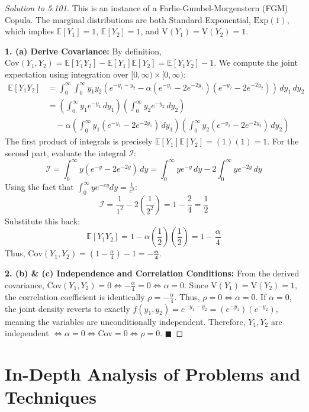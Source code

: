 \documentclass[11pt, a4paper]{article}
\theoremstyle{definition}
\theoremstyle{remark}
\newcommand{\E}{\mathbb{E}}
\newcommand{\Cov}{\mathrm{Cov}}
\newcommand{\Var}{\mathrm{V}}
\begin{document}
\begin{proof}[Solution to 5.101]
This is an instance of a Farlie-Gumbel-Morgenstern (FGM) Copula. The marginal distributions are both Standard Exponential, $\text{Exp}(1)$, which implies $\E[Y_1] = 1$, $\E[Y_2] = 1$, and $\Var(Y_1)=\Var(Y_2)=1$.

\textbf{1. (a) Derive Covariance:}
By definition, $\Cov(Y_1, Y_2) = \E[Y_1 Y_2] - \E[Y_1]\E[Y_2] = \E[Y_1 Y_2] - 1$. We compute the joint expectation using integration over $[0, \infty) \times [0, \infty)$:
\begin{align*}
\E[Y_1 Y_2] &= \int_0^\infty \int_0^\infty y_1 y_2 \left( e^{-y_1-y_2} - \alpha (e^{-y_1} - 2e^{-2y_1})(e^{-y_2} - 2e^{-2y_2}) \right) \,dy_1 \,dy_2 \\
&= \left(\int_0^\infty y_1 e^{-y_1} \,dy_1 \right) \left(\int_0^\infty y_2 e^{-y_2} \,dy_2 \right) \\
&\quad - \alpha \left(\int_0^\infty y_1(e^{-y_1} - 2e^{-2y_1}) \,dy_1 \right) \left(\int_0^\infty y_2(e^{-y_2} - 2e^{-2y_2}) \,dy_2 \right)
\end{align*}
The first product of integrals is precisely $\E[Y_1]\E[Y_2] = (1)(1) = 1$.
For the second part, evaluate the integral $\mathcal{I}$:
\[
\mathcal{I} = \int_0^\infty y(e^{-y} - 2e^{-2y}) \,dy = \int_0^\infty y e^{-y} \,dy - 2\int_0^\infty y e^{-2y} \,dy
\]
Using the fact that $\int_0^\infty y e^{-cy} dy = \frac{1}{c^2}$:
\[
\mathcal{I} = \frac{1}{1^2} - 2\left(\frac{1}{2^2}\right) = 1 - \frac{2}{4} = \frac{1}{2}
\]
Substitute this back:
\[
\E[Y_1 Y_2] = 1 - \alpha \left(\frac{1}{2}\right)\left(\frac{1}{2}\right) = 1 - \frac{\alpha}{4}
\]
Thus, $\Cov(Y_1, Y_2) = \left( 1 - \frac{\alpha}{4} \right) - 1 = \mathbf{-\frac{\alpha}{4}}$.

\textbf{2. (b) \& (c) Independence and Correlation Conditions:}
From the derived covariance, $\Cov(Y_1, Y_2) = 0 \iff -\frac{\alpha}{4} = 0 \iff \alpha = 0$.
Since $\Var(Y_1) = \Var(Y_2) = 1$, the correlation coefficient is identically $\rho = -\frac{\alpha}{4}$. Thus, $\rho = 0 \iff \alpha = 0$.
If $\alpha = 0$, the joint density reverts to exactly $f(y_1, y_2) = e^{-y_1-y_2} = (e^{-y_1})(e^{-y_2})$, meaning the variables are unconditionally independent.
Therefore, $Y_1, Y_2$ are independent $\iff \alpha=0 \iff \Cov=0 \iff \rho=0$. $\blacksquare$
\end{proof}

\newpage
\section{In-Depth Analysis of Problems and Techniques}
\end{document}
